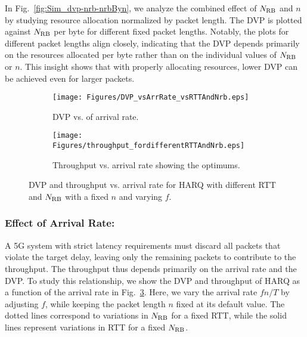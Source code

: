 In Fig.~\ref{fig:Sim_dvp-nrb-nrbByn}, we analyze the combined effect of $N_{\mathrm{RB}}$ and $n$ by studying resource allocation normalized by packet length. The DVP is plotted against $N_{\mathrm{RB}}$ per byte for different fixed packet lengths. 
Notably, the plots for different packet lengths align closely, indicating that the DVP depends primarily on the resources allocated per byte rather than on the individual values of $N_{\mathrm{RB}}$ or $n$. This insight shows that with properly allocating resources, lower DVP can be achieved even for larger packets.
\begin{figure*}[t]
\centering
\begin{subfigure}[t]{0.49\textwidth}
\centering
\texttt{[image: Figures/DVP\_vsArrRate\_vsRTTAndNrb.eps]}
\caption{DVP vs. of arrival rate.}
\label{fig:DvpvsArrivalrate}
\end{subfigure}
\begin{subfigure}[t]{0.49\textwidth}
\centering
\texttt{[image: Figures/throughput\_fordifferentRTTAndNrb.eps]}
\caption{Throughput vs. arrival rate showing the optimums.}
\label{fig:ThroughputVsArrivalrate}
\end{subfigure}
\caption{DVP and throughput vs. arrival rate for HARQ with different RTT and $N_{\mathrm{RB}}$ with a fixed $n$ and varying $f$.}
\label{fig:DvpThroughputVsArrivalRate}
\end{figure*}



\subsubsection*{Effect of Arrival Rate:}
A 5G system with strict latency requirements must discard all packets that violate the target delay, leaving only the remaining packets to contribute to the throughput. 
The throughput thus depends primarily on the arrival rate and the DVP. 
To study this relationship, we show the DVP and throughput of HARQ as a function of the arrival rate in Fig.~\ref{fig:DvpThroughputVsArrivalRate}.
Here, we vary the arrival rate $fn/T$ by adjusting $f$, while keeping the packet length $n$ fixed at its default value.
The dotted lines correspond to variations in $N_{\mathrm{RB}}$ for a fixed RTT, while the solid lines represent variations in RTT for a fixed $N_{\mathrm{RB}}$.

